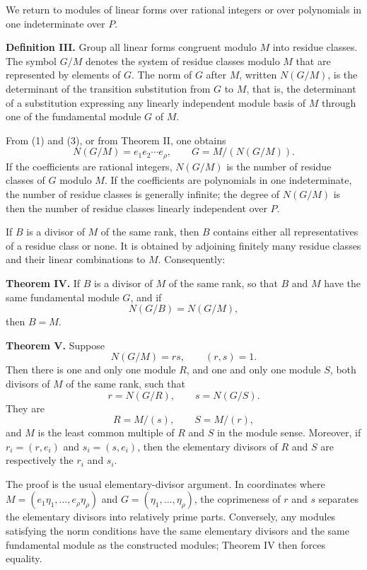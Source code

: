 \documentclass[12pt]{article}
\begin{document}
We return to modules of linear forms over rational integers or over polynomials in one indeterminate over $P$.

\textbf{Definition III.} Group all linear forms congruent modulo $M$ into residue classes. The symbol $G/M$ denotes the system of residue classes modulo $M$ that are represented by elements of $G$. The norm of $G$ after $M$, written $N(G/M)$, is the determinant of the transition substitution from $G$ to $M$, that is, the determinant of a substitution expressing any linearly independent module basis of $M$ through one of the fundamental module $G$ of $M$.

From (1) and (3), or from Theorem II, one obtains
\begin{equation}
  N(G/M)=e_1e_2\cdots e_\rho,
  \qquad
  G=M/(N(G/M)).                                                     \tag{9}
\end{equation}
If the coefficients are rational integers, $N(G/M)$ is the number of residue classes of $G$ modulo $M$. If the coefficients are polynomials in one indeterminate, the number of residue classes is generally infinite; the degree of $N(G/M)$ is then the number of residue classes linearly independent over $P$.

If $B$ is a divisor of $M$ of the same rank, then $B$ contains either all representatives of a residue class or none. It is obtained by adjoining finitely many residue classes and their linear combinations to $M$. Consequently:

\textbf{Theorem IV.} If $B$ is a divisor of $M$ of the same rank, so that $B$ and $M$ have the same fundamental module $G$, and if
\[
  N(G/B)=N(G/M),
\]
then $B=M$.

\textbf{Theorem V.} Suppose
\begin{equation}
  N(G/M)=rs,\qquad (r,s)=1.                                      \tag{10}
\end{equation}
Then there is one and only one module $R$, and one and only one module $S$, both divisors of $M$ of the same rank, such that
\[
  r=N(G/R),\qquad s=N(G/S).
\]
They are
\begin{equation}
  R=M/(s),
  \qquad S=M/(r),                                                  \tag{11}
\end{equation}
and $M$ is the least common multiple of $R$ and $S$ in the module sense. Moreover, if $r_i=(r,e_i)$ and $s_i=(s,e_i)$, then the elementary divisors of $R$ and $S$ are respectively the $r_i$ and $s_i$.

The proof is the usual elementary-divisor argument. In coordinates where $M=(e_1\eta_1,\ldots,e_\rho\eta_\rho)$ and $G=(\eta_1,\ldots,\eta_\rho)$, the coprimeness of $r$ and $s$ separates the elementary divisors into relatively prime parts. Conversely, any modules satisfying the norm conditions have the same elementary divisors and the same fundamental module as the constructed modules; Theorem IV then forces equality.
\end{document}
